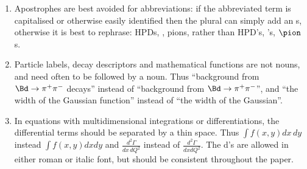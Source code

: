 \begin{enumerate}
\item Apostrophes are best avoided for abbreviations: if the abbreviated term
  is capitalised or otherwise easily identified then the plural can simply add
  an s, otherwise it is best to rephrase: \eg HPDs, \pizs, pions, rather
  than HPD's, \piz's, $\pion$s.

\item Particle labels, decay descriptors and mathematical functions are not nouns, and need often to be followed by a noun. 
Thus ``background from $\Bd\to\pi^+\pi^-$ decays'' instead of ``background from $\Bd\to\pi^+\pi^-$'',
and ``the width of the Gaussian function'' instead of ``the width of the Gaussian''.

\item In equations with multidimensional integrations or differentiations, the differential terms should be separated by a thin space. 
Thus $\int f(x,y) dx\,dy$ instead $\int f(x,y) dxdy$ and
$\frac{d^2\Gamma}{dx\,dQ^2}$ instead of $\frac{d^2\Gamma}{dxdQ^2}$.
The d's are allowed in either roman or italic font, but should be consistent throughout the paper.


\end{enumerate}
